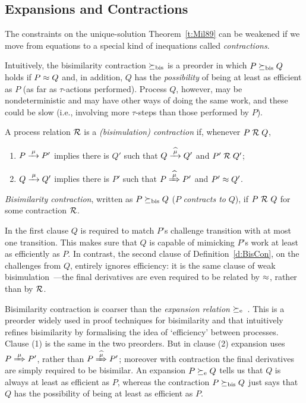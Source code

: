 \subsection{Expansions and Contractions}
\label{s:mcontr}

The constraints on the unique-solution Theorem~\ref{t:Mil89} can be 
weakened if we move from equations to a special kind of inequations called
  \emph{contractions}.

Intuitively, the bisimilarity contraction $\mathrel{\succeq_{\rm{bis}}}$ is a preorder in which 
$P \mathrel{\succeq_{\rm{bis}}} Q  $  holds  if $P \approx Q$ and, in addition, 
$Q$ has the \emph{possibility} of being at least as efficient as $P$ (as far as
$\tau$-actions performed). 
Process $Q$, however, may be nondeterministic and may have other ways
of doing the same work, and these could be  slow (i.e., involving
more $\tau$-steps than those performed by $P$).

\begin{definition}%
\label{d:BisCon}
A process relation ${{\cal R}}$ 
 is a \emph{(bisimulation) contraction} if, whenever
 $P\mathrel{\cal R} Q$, %

\begin{enumerate}
\item   $P \arr\mu P'$ implies there is $Q'$ such that $Q \arcap \mu
  Q'$ and $P' \mathrel{\cal R} Q'$;
\item $Q \arr\mu Q'$   implies there is $P'$ such that $P \Arcap \mu
 P'$ and $P' \approx Q'$\enspace.
\end{enumerate}
\emph{Bisimilarity contraction}, written as $P \mathrel{\succeq_{\rm{bis}}} Q$ ($P$
\emph{contracts to} $Q$), if $P\ {\cal R}\ Q$ for some contraction ${\cal R}$.
\end{definition}

In the first clause $Q$ is required to match $P$'s challenge
transition with at most one transition.
This makes sure that $Q$ is capable of mimicking $P$'s
work at least as efficiently as $P$. 
In contrast, the second clause of Definition~\ref{d:BisCon}, on the
challenges from $Q$, entirely ignores efficiency: it is the same
clause of  weak bisimulation~---the final derivatives are even required
to be related  by $\approx$, rather than by ${\cal R}$.

Bisimilarity  contraction is coarser than 
 the \emph{expansion relation} $\mathrel{\succeq_{\rm{e}}}$~\cite{arun1992efficiency,sangiorgi2015equations}.
This is a
preorder widely used in proof techniques for bisimilarity and that 
intuitively refines bisimilarity by 
 formalising the idea of `efficiency' between processes.
Clause (1) is the same in the two
preorders. But in clause (2) expansion uses 
$P \Arr \mu P'$, rather than $P \Arcap \mu P'$; 
 moreover with
contraction the final derivatives are simply required to be bisimilar.
An expansion 
$P \mathrel{\succeq_{\rm{e}}} Q$
tells us  that $Q$ is always at least as efficient as $P$, whereas  the
 contraction $P \mathrel{\succeq_{\rm{bis}}} Q$  just says that $Q$ has the possibility of
being at least as efficient as $P$. 

